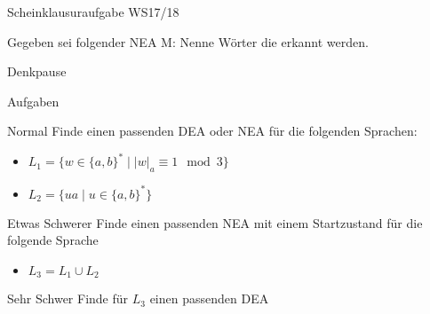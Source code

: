 {
\begin{frame}{Scheinklausuraufgabe WS17/18}
    \begin{alertblock} {Gegeben sei folgender NEA M:}
        Nenne Wörter die erkannt werden.\\
    \end{alertblock}
\end{frame}
}

{
\begin{frame}{Denkpause}
    \footnotesize
    \begin{alertblock}{Aufgaben}
    \end{alertblock}
    \begin{block}{Normal}
        Finde einen passenden DEA oder NEA für die folgenden Sprachen:
        \begin{itemize}
            \item $L_1 = \{w \in \{a,b\}^* \mid |w|_a \equiv 1 \mod{3}\}$
            \item $L_2 = \{ua\mid u \in \{a,b\}^*\}$
        \end{itemize}
    \end{block}
    \begin{block}{Etwas Schwerer}
        Finde einen passenden NEA mit \alert{einem} Startzustand für die folgende Sprache
        \begin{itemize}
            \item $L_3 = L_1 \cup L_2$
        \end{itemize}
    \end{block}
    \begin{block}{Sehr Schwer}
        Finde für $L_3$ einen passenden DEA
    \end{block}
\end{frame}
}

